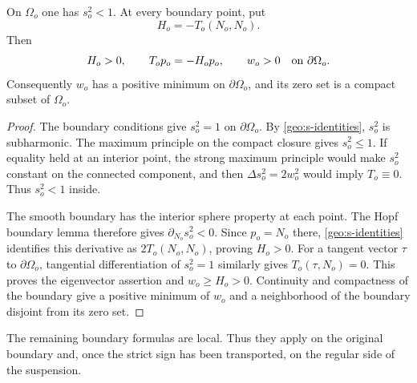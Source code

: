 \begin{lemma}
\label{geo:gradient-bound}
On $\Omega_o$ one has $s_o^2<1$. At every boundary point, put
\begin{equation}\label{geo:H-definition}
 H_o=-T_o(N_o,N_o).
\end{equation}
Then
\begin{equation}\label{geo:strict-boundary-sign}
 H_o>0,\qquad T_op_o=-H_op_o,\qquad w_o>0
 \quad\hbox{on }\partial\Omega_o.
\end{equation}
Consequently $w_o$ has a positive minimum on $\partial\Omega_o$,
and its zero set is a compact subset of $\Omega_o$.
\end{lemma}

\begin{proof}
The boundary conditions give $s_o^2=1$ on $\partial\Omega_o$.
By \eqref{geo:s-identities}, $s_o^2$ is subharmonic.
The maximum principle on the compact closure gives $s_o^2\le1$.
If equality held at an interior point, the strong maximum principle
would make $s_o^2$ constant on the connected component, and then
$\Delta s_o^2=2w_o^2$ would imply $T_o\equiv0$. Thus $s_o^2<1$ inside.

The smooth boundary has the interior sphere property at each point.
The Hopf boundary lemma therefore gives
$\partial_{N_o}s_o^2<0$. Since $p_o=N_o$ there,
\eqref{geo:s-identities} identifies this derivative as
$2T_o(N_o,N_o)$, proving $H_o>0$.
For a tangent vector $\tau$ to $\partial\Omega_o$, tangential
differentiation of $s_o^2=1$ similarly gives $T_o(\tau,N_o)=0$.
This proves the eigenvector assertion and $w_o\ge H_o>0$.
Continuity and compactness of the boundary give a positive minimum
of $w_o$ and a neighborhood of the boundary disjoint from its zero set.
\end{proof}

The remaining boundary formulas are local. Thus they apply on the
original boundary and, once the strict sign has been transported,
on the regular side of the suspension.

